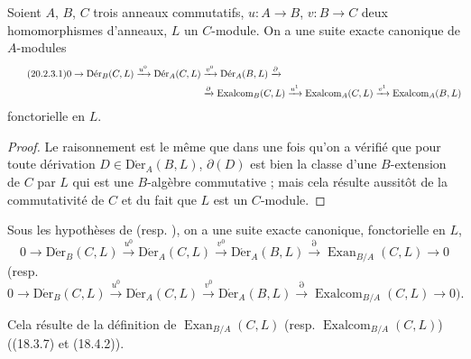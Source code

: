 \begin{corollary}[20.2.3]
\label{0.20.2.3-fr}
Soient $A$, $B$, $C$ trois anneaux commutatifs, $u:A\to B$, $v:B\to C$
deux homomorphismes d'anneaux, $L$ un $C$-module. On a une suite exacte
canonique de $A$-modules
\begin{align}
\tag{20.2.3.1}
\label{0.20.2.3.1-fr}
  0\to\operatorname{D\acute{e}r}_B(C,L)\xrightarrow{u^0}
  \operatorname{D\acute{e}r}_A(C,L)&\xrightarrow{v^0}
  \operatorname{D\acute{e}r}_A(B,L)\xrightarrow{\partial} \\
  &\xrightarrow{\partial}\operatorname{Exalcom}_B(C,L)\xrightarrow{u^1}
  \operatorname{Exalcom}_A(C,L)\xrightarrow{v^1}
  \operatorname{Exalcom}_A(B,L) \notag
\end{align}
fonctorielle en $L$.
\end{corollary}

\begin{proof}
Le raisonnement est le même que dans  une fois qu'on a
vérifié que pour toute dérivation $D\in\operatorname{D\acute{e}r}_A(B,L)$,
$\partial(D)$ est bien la classe d'une $B$-extension de $C$ par $L$ qui est
une $B$-algèbre commutative ; mais cela résulte aussitôt de la commutativité
de $C$ et du fait que $L$ est un $C$-module.
\end{proof}

\begin{corollary}[20.2.4]
\label{0.20.2.4-fr}
Sous les hypothèses de  \textup{(resp.}
), on a une suite exacte canonique, fonctorielle en $L$,
\begin{equation}
\tag{20.2.4.1}
\label{0.20.2.4.1-fr}
  0\to\operatorname{D\acute{e}r}_B(C,L)\xrightarrow{u^0}
  \operatorname{D\acute{e}r}_A(C,L)\xrightarrow{v^0}
  \operatorname{D\acute{e}r}_A(B,L)\xrightarrow{\partial}
  \operatorname{Exan}_{B/A}(C,L)\to0
\end{equation}
\textup{(resp.}
\begin{equation}
\tag{20.2.4.2}
\label{0.20.2.4.2-fr}
  0\to\operatorname{D\acute{e}r}_B(C,L)\xrightarrow{u^0}
  \operatorname{D\acute{e}r}_A(C,L)\xrightarrow{v^0}
  \operatorname{D\acute{e}r}_A(B,L)\xrightarrow{\partial}
  \operatorname{Exalcom}_{B/A}(C,L)\to0\text{).}
\end{equation}
\end{corollary}
\noindent Cela résulte de la définition de $\operatorname{Exan}_{B/A}(C,L)$ (resp.
$\operatorname{Exalcom}_{B/A}(C,L)$) ((18.3.7) et (18.4.2)).

